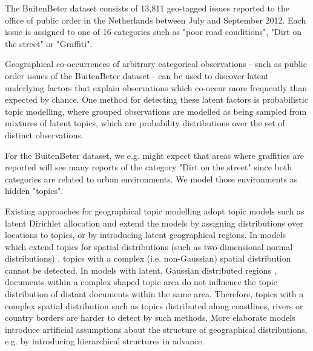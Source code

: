 
The BuitenBeter dataset consists of 13,811 geo-tagged issues reported to the
office of public order in the Netherlands between July and September 2012.  Each
issue is assigned to one of 16 categories such as "poor road conditions", "Dirt
on the street" or "Graffiti".

Geographical co-occurrences of arbitrary categorical observations - such as
public order issues of the BuitenBeter dataset - can be used to discover latent
underlying factors that explain observations which co-occur more frequently than
expected by chance.  One method for detecting these latent factors is
probabilistic topic modelling, where grouped observations are modelled as being
sampled from mixtures of latent topics, which are probability distributions over
the set of distinct observations.

For the BuitenBeter dataset, we e.g. might expect that areas where graffities
are reported will see many reports of the category "Dirt on the street" since
both categories are related to urban environments. We model those environments
as hidden "topics".
  
Existing approaches for geographical topic modelling adopt topic models such as
latent Dirichlet allocation \cite{Blei:2003:LDA:944919.944937} and extend the
models by assigning distributions over locations to topics, or by introducing
latent geographical regions. In models which extend topics for spatial
distributions (such as two-dimensional normal distributions)
\cite{conf/wsdm/Sizov10}, topics with a complex (i.e. non-Gaussian) spatial
distribution cannot be detected. In models with latent, Gaussian distributed
regions \cite{conf/www/YinCHZH11}, documents within a complex shaped topic area
do not influence the topic distribution of distant documents within the same
area. Therefore, topics with a complex spatial distribution such as topics
distributed along coastlines, rivers or country borders are harder to detect by
such methods.  More elaborate models introduce artificial assumptions about the
structure of geographical distributions, e.g. by introducing hierarchical
structures \cite{ahmed13} in advance.

